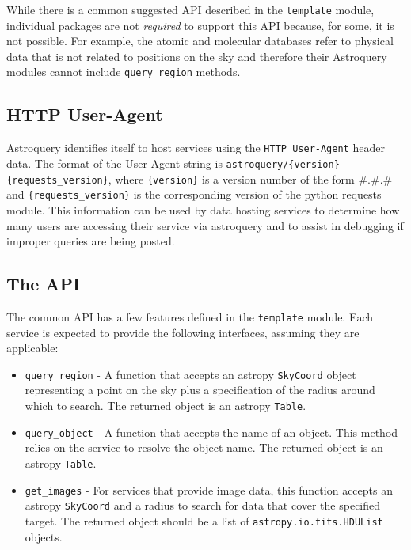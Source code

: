 \documentclass[twocolumn]{aastex61}
\begin{document}
While there is a common suggested API described in the \texttt{template} module,
individual packages are not \emph{required} to support this API because, for
some, it is not possible.  For example, the atomic and molecular databases refer
to physical data that is not related to positions on the sky and therefore
their Astroquery modules cannot include \texttt{query\_region} methods.

\subsection{HTTP User-Agent}
Astroquery identifies itself to host services using the \texttt{HTTP
User-Agent} header data.  The format of the User-Agent string is
\texttt{astroquery/\{version\} \{requests\_version\}}, where
\texttt{\{version\}} is a version number of the form \#.\#.\# and
\texttt{\{requests\_version\}} is the corresponding version of the python
requests module.  This information can be used by data hosting services
to determine how many users are accessing their service via astroquery
and to assist in debugging if improper queries are being posted.

\subsection{The API}
The common API has a few features defined in the \texttt{template} module.
Each service is expected to provide the following interfaces, assuming they are
applicable:

\begin{itemize}
    \item \texttt{query\_region} - A function that accepts an astropy
        \texttt{SkyCoord} object representing a point on the sky plus a
        specification of the radius around which to search.
        The returned object is an astropy \texttt{Table}.
    \item \texttt{query\_object} - A function that accepts the name of an
        object.  This method relies on the service to resolve the object name.
        The returned object is an astropy \texttt{Table}.
    \item \texttt{get\_images} - For services that provide image data, this
        function accepts an astropy \texttt{SkyCoord} and a radius to search for data
        that cover the specified target. The returned object should be a list
        of \texttt{astropy.io.fits.HDUList} objects.
\end{itemize}
\end{document}
